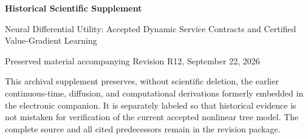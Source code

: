 \documentclass[11pt,letterpaper]{article}
\theoremstyle{definition}
\newcommand{\1}{\mathbf 1}
\begin{document}
\begin{center}{\Large\bfseries Historical Scientific Supplement\par}\medskip
{\large Neural Differential Utility: Accepted Dynamic Service Contracts and Certified Value-Gradient Learning\par}\medskip
Preserved material accompanying Revision R12, September 22, 2026
\end{center}
This archival supplement preserves, without scientific deletion, the earlier continuous-time, diffusion, and computational derivations formerly embedded in the electronic companion. It is separately labeled so that historical evidence is not mistaken for verification of the current accepted nonlinear tree model. The complete source and all cited predecessors remain in the revision package.










\clearpage

\clearpage

\end{document}
